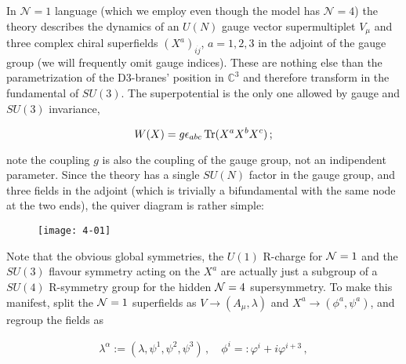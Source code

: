 In $\mathcal{N}=1$ language (which we employ even though the model has $\mathcal{N}=4$) the theory describes the dynamics of an $U(N)$ gauge vector supermultiplet $V_\mu$ and three complex chiral superfields $(X^a)_{i\dot j}$, $a=1,2,3$ in the adjoint of the gauge group (we will frequently omit gauge indices). These are nothing else than the parametrization of the D3-branes' position in $\mathbb{C}^3$ and therefore transform in the fundamental of $SU(3)$. The superpotential is the only one allowed by gauge and $SU(3)$ invariance,

\begin{equation} W(X) = g \epsilon_{abc} \operatorname{Tr} ( X^a X^b X^c) \label{sym4potential}\,;
\end{equation}

note the coupling $g$ is also the coupling of the gauge group, not an indipendent parameter. Since the theory has a single $SU(N)$ factor in the gauge group, and three fields in the adjoint (which is trivially a bifundamental with the same node at the two ends), the quiver diagram is rather simple:


\begin{figure}[H]
	\centering
	\texttt{[image: 4-01]}
\end{figure}


Note that the obvious global symmetries, the $U(1)$ R-charge for $\mathcal{N} = 1$ and the $SU(3)$ flavour symmetry acting on the $X^a$ are actually just a subgroup of a $SU(4)$ R-symmetry group for the hidden $\mathcal{N} = 4$ supersymmetry. To make this manifest, split the $\mathcal{N}=1$ superfields as $V \rightarrow (A_\mu,\lambda)$ and $X^a \rightarrow (\phi^a,\psi^a)$, and regroup the fields as

\begin{align}
	\lambda^\alpha := (\lambda,\psi^1,\psi^2,\psi^3)\,,\quad \phi^i =: \varphi^i + i \varphi^{i+3}\,,
	\label{}
\end{align}

